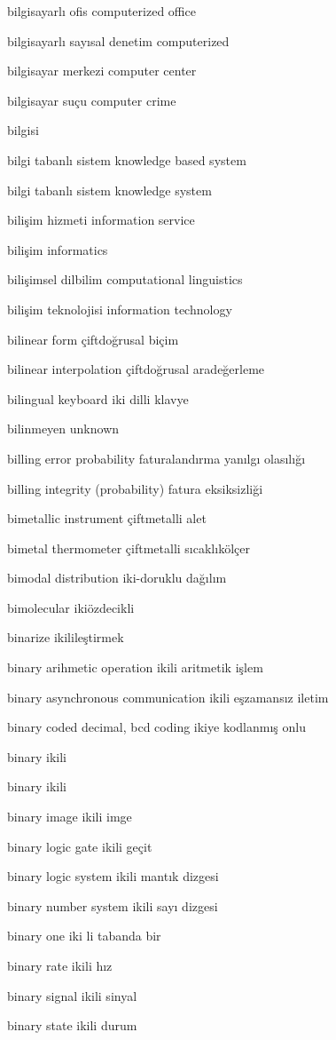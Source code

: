 \documentclass[12pt,fleqn]{article}\usepackage{../../common}
\begin{document}
bilgisayarlı ofis computerized office

bilgisayarlı sayısal denetim computerized

bilgisayar merkezi computer center

bilgisayar suçu computer crime

bilgisi

bilgi tabanlı sistem knowledge based system

bilgi tabanlı sistem knowledge system

bilişim hizmeti information service

bilişim informatics

bilişimsel dilbilim computational linguistics

bilişim teknolojisi information technology

bilinear form çiftdoğrusal biçim

bilinear interpolation çiftdoğrusal aradeğerleme

bilingual keyboard iki dilli klavye

bilinmeyen unknown

billing error probability faturalandırma yanılgı olasılığı

billing integrity (probability) fatura eksiksizliği

bimetallic instrument çiftmetalli alet

bimetal thermometer çiftmetalli sıcaklıkölçer

bimodal distribution iki-doruklu dağılım

bimolecular ikiözdecikli

binarize ikilileştirmek

binary arihmetic operation ikili aritmetik işlem

binary asynchronous communication ikili eşzamansız iletim

binary coded decimal, bcd coding ikiye kodlanmış onlu

binary ikili

binary ikili

binary image ikili imge

binary logic gate ikili geçit

binary logic system ikili mantık dizgesi

binary number system ikili sayı dizgesi

binary one iki li tabanda bir

binary rate ikili hız

binary signal ikili sinyal

binary state ikili durum
\end{document}
